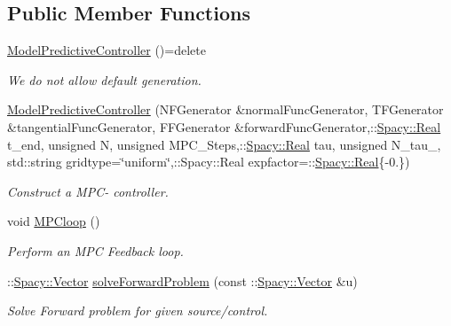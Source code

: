 \subsection*{Public Member Functions}
\begin{DoxyCompactItemize}
\item 
\hypertarget{group__KaskadeParabolicGroup_gaf64fe59c15ac16711e93f3d354b14d7d}{\hyperlink{group__KaskadeParabolicGroup_gaf64fe59c15ac16711e93f3d354b14d7d}{Model\-Predictive\-Controller} ()=delete}\label{group__KaskadeParabolicGroup_gaf64fe59c15ac16711e93f3d354b14d7d}

\begin{DoxyCompactList}\small\item\em We do not allow default generation. \end{DoxyCompactList}\item 
\hyperlink{group__KaskadeParabolicGroup_ga94abd500e2d7bb0711e2bd2997ac3b0c}{Model\-Predictive\-Controller} (N\-F\-Generator \&normal\-Func\-Generator, T\-F\-Generator \&tangential\-Func\-Generator, F\-F\-Generator \&forward\-Func\-Generator,\-::\hyperlink{classSpacy_1_1Real}{Spacy\-::\-Real} t\-\_\-end, unsigned N, unsigned M\-P\-C\-\_\-\-Steps,\-::\hyperlink{classSpacy_1_1Real}{Spacy\-::\-Real} tau, unsigned N\-\_\-tau\-\_\-, std\-::string gridtype=\char`\"{}uniform\char`\"{},\-::Spacy\-::\-Real expfactor=\-::\hyperlink{classSpacy_1_1Real}{Spacy\-::\-Real}\{-\/0.\})
\begin{DoxyCompactList}\small\item\em Construct a M\-P\-C-\/ controller. \end{DoxyCompactList}\item 
void \hyperlink{group__KaskadeParabolicGroup_ga5ec38126a42c548b1d08f0d96708bbbd}{M\-P\-Cloop} ()
\begin{DoxyCompactList}\small\item\em Perform an M\-P\-C Feedback loop. \end{DoxyCompactList}\item 
\-::\hyperlink{classSpacy_1_1Vector}{Spacy\-::\-Vector} \hyperlink{group__KaskadeParabolicGroup_ga1a532fdeab463607601829afd5091a11}{solve\-Forward\-Problem} (const \-::\hyperlink{classSpacy_1_1Vector}{Spacy\-::\-Vector} \&u)
\begin{DoxyCompactList}\small\item\em Solve Forward problem for given source/control. \end{DoxyCompactList}\end{DoxyCompactItemize}


